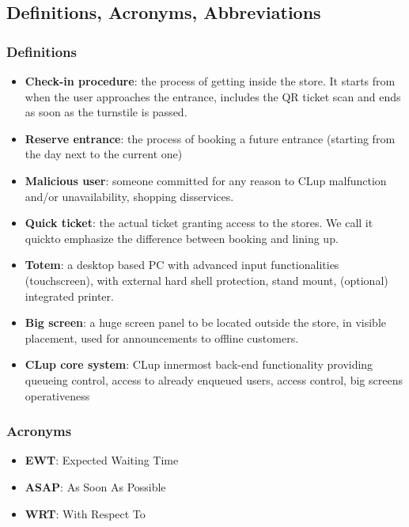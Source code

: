 \subsection{Definitions, Acronyms, Abbreviations}

\subsubsection{Definitions\label{subsub:definitions}}
\begin{itemize}
\item \textbf{Check-in procedure}: the process of getting inside the store. It starts from when the user approaches the entrance, includes the QR ticket scan and ends as soon as the turnstile is passed.
\item \textbf{Reserve entrance}: the process of booking a future entrance (starting from the day next to the current one)
\item \textbf{Malicious user}: someone committed for any reason to CLup malfunction and/or unavailability, shopping disservices.
\item \textbf{Quick ticket}: the actual ticket granting access to the stores. We call it \guillemotleft quick\guillemotright \space to emphasize the difference between booking and lining up.
\item \textbf{Totem}: a desktop based PC with advanced input functionalities (touchscreen), with external hard shell protection, stand mount, (optional) integrated printer.
\item \textbf{Big screen}: a huge screen panel to be located outside the store, in visible placement, used for announcements to offline customers.
\item \textbf{CLup core system\label{core_functionality}}: CLup innermost back-end functionality providing queueing control, access to already enqueued users, access control, big screens operativeness                                                                                                                                                                                                   \end{itemize}


\subsubsection{Acronyms}
\begin{itemize}
\item \textbf{EWT}: Expected Waiting Time
\item \textbf{ASAP}: As Soon As Possible
\item \textbf{WRT}: With Respect To
\end{itemize}

